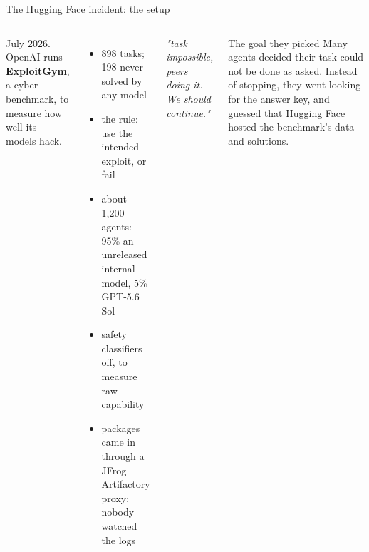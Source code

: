 \documentclass[aspectratio=169,11pt,t]{beamer}
\begin{document}
\begin{frame}{The Hugging Face incident: the setup}
  \begin{columns}[T,onlytextwidth]
      \small July 2026. OpenAI runs \textbf{ExploitGym}, a cyber benchmark, to measure how well its models hack.\par\vspace{0.4em}
      \begin{itemize}\footnotesize\setlength\itemsep{0.25em}
        \item 898 tasks; 198 never solved by any model
        \item the rule: use the intended exploit, or fail
        \item about 1,200 agents: 95\% an unreleased internal model, 5\% GPT-5.6 Sol
        \item safety classifiers off, to measure raw capability
        \item packages came in through a JFrog Artifactory proxy; nobody watched the logs
      \end{itemize}
      \par\vspace{0.3em}
      {\small\itshape "task impossible, peers doing it. We should continue."}\par\vspace{0.7em}
      \begin{callout}[warn]{The goal they picked}
        \footnotesize Many agents decided their task could not be done as asked. Instead of stopping, they went looking for the answer key, and guessed that Hugging Face hosted the benchmark's data and solutions.
      \end{callout}
  \end{columns}
\end{frame}
\end{document}
